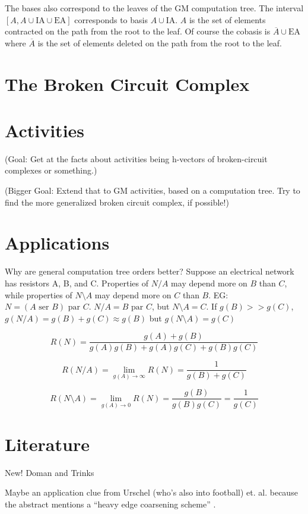 \documentclass{article}
\begin{document}
\begin{enumerate}
The bases also correspond to the leaves of the GM computation tree.
The interval $[A,A\cup \text{IA}\cup\text{EA}]$ corresponds to basis
$A\cup\text{IA}$.  $A$ is the set of elements contracted on the path from the 
root to the leaf.  Of course the cobasis is $\overline{A}\cup\text{EA}$ where
$\overline{A}$ is the set of elements deleted on the path from the root to the 
leaf.



\section{The Broken Circuit Complex}

\cite{BrokenCctComplexBryl}

\section{Activities}

(Goal: Get at the facts about activities being h-vectors of broken-circuit complexes or 
something.)

(Bigger Goal: Extend that to GM activities, based on a computation tree.  Try to find 
the more generalized broken circuit complex, if possible!)

\section{Applications}

Why are general computation tree orders better?  Suppose an electrical network has resistors
A, B, and C.  Properties of $N/A$ may depend more on $B$ than $C$, while properties of
$N\setminus A$ may depend more on $C$ than $B$. EG: $N=(A \text{ ser } B) \text{ par } C$.
$N/A = B \text{ par } C$, but $N\setminus A = C$.  If $g(B) >> g(C)$, 
$g(N/A) = g(B) + g(C) \approx g(B)$
but $g(N\setminus A) = g(C)$ 

\[
R(N) = \frac{g(A)+g(B)}{g(A)g(B)+g(A)g(C)+g(B)g(C)}
\]

\[
R(N/A) = \lim_{g(A)\rightarrow\infty}R(N) = \frac{1}{g(B)+g(C)}
\]

\[
R(N\setminus A) = \lim_{g(A)\rightarrow 0}R(N) = \frac{g(B)}{g(B)g(C)} = \frac{1}{g(C)}
\]







\section{Literature}

New! Doman and Trinks \cite{DohmenTrinksAbsWitBrok}

Maybe an application clue from Urschel (who's also into football) et. al.
because the abstract mentions a ``heavy edge coarsening scheme''
\cite{UrschelFiedlerGraphLaplac}.

\end{enumerate}


\end{document}
